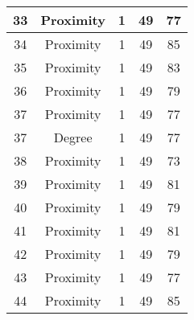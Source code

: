 \documentclass[results.tex]{subfiles}
\begin{document}
\begin{center}
\begin{tabular}{| c || c | c | c | c |}
            \hline
            33                      & Proximity                    & 1                      & 49                      & 77                   \\
            \hline
            34                      & Proximity                    & 1                      & 49                      & 85                   \\
            \hline
            35                      & Proximity                    & 1                      & 49                      & 83                   \\
            \hline
            36                      & Proximity                    & 1                      & 49                      & 79                   \\
            \hline
            37                      & Proximity                    & 1                      & 49                      & 77                   \\
            \hline
            37                      & Degree                       & 1                      & 49                      & 77                   \\
            \hline
            38                      & Proximity                    & 1                      & 49                      & 73                   \\
            \hline
            39                      & Proximity                    & 1                      & 49                      & 81                   \\
            \hline
            40                      & Proximity                    & 1                      & 49                      & 79                   \\
            \hline
            41                      & Proximity                    & 1                      & 49                      & 81                   \\
            \hline
            42                      & Proximity                    & 1                      & 49                      & 79                   \\
            \hline
            43                      & Proximity                    & 1                      & 49                      & 77                   \\
            \hline
            44                      & Proximity                    & 1                      & 49                      & 85                   \\

\end{tabular}
\end{center}
\end{document}
